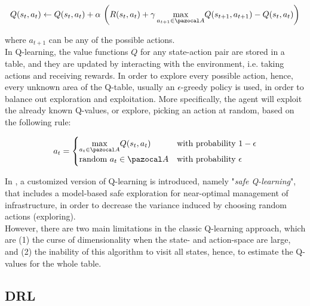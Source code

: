 \begin{equation}
    Q(s_t, a_t) \leftarrow Q(s_t,a_t) + \alpha \, \left( R(s_t, a_t) + \gamma \, \underset{a_{t+1} \in \ccal{A}}{\text{max}}Q(s_{t+1},a_{t+1}) - Q(s_t, a_t) \right)
\end{equation}

where $a_{t+1}$ can be any of the possible actions.\\

In Q-learning, the value functions $Q$ for any state-action pair are stored in a table, and they are updated by interacting with the environment, i.e. taking actions and receiving rewards. In order to explore every possible action, hence, every unknown area of the Q-table, usually an $\epsilon$-greedy policy is used, in order to balance out exploration and exploitation. More specifically, the agent will exploit the already known Q-values, or explore, picking an action at random, based on the following rule:

\begin{equation}
    a_t = 
    \begin{cases} 
        \underset{a_t\in \ccal{A}}{\text{max}}Q(s_t, a_t) & \text{with probability } 1-\epsilon \\
        \text{random } a_t \in \ccal{A} & \text{with probability } \epsilon
    \end{cases}
\end{equation}

In \cite{memarzadeh2019model}, a customized version of Q-learning is introduced, namely "\textit{safe Q-learning}", that includes a model-based safe exploration for near-optimal management of infrastructure, in order to decrease the variance induced by choosing random actions (exploring).\\

However, there are two main limitations in the classic Q-learning approach, which are (1) the curse of dimensionality when the state- and action-space are large, and (2) the inability of this algorithm to visit all states, hence, to estimate the Q-values for the whole table. 




\subsection{\acrfull{DRL}}

